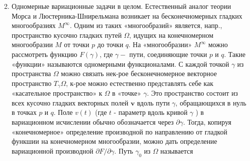 \documentclass[10pt]{article}
\begin{document}
\begin{enumerate}

  \setcounter{enumi}{1}

  \item Одномерные вариационные задачи в целом. Естественный аналог теории Морса и Люстерника-Шнирельмана возникает на бесконечномерных гладких многообразиях $M^{\infty}$. Одним из таких «многообразий» является, напр., пространство кусочно гладких путей $\Omega$, идущих на конечномерном многообразии $M$ от точки $p$ до точки $q$. На «многообразии» $M^{\infty}$ можно рассмотреть функцию $F(\gamma)$, где $\gamma-$ пути, соединяющие точки $p$ и $q$. Такие «функции» называются одномерными функционалами. С каждой точкой $\gamma$ из пространства $\Omega$ можно связать нек-рое бесконечномерное векторное пространство $T_{\gamma} \Omega$, к-рое можно естественно представлять себе как «касательное пространство» к $\Omega$ в «точке» $\gamma$. Это пространство состоит из всех кусочно гладких векторных полей $\boldsymbol{v}$ вдоль пути $\gamma$, обращающихся в нуль в точках $p$ и $q$. Поле $v(t)$ (где $t$ - параметр вдоль кривой $\gamma$ ) в вариационном исчислении обычно обозначается через $\partial \gamma$. Тогда, копируя «конечномерное» определение производной по направлению от гладкой функшии на конечномерном многообразии, можно дать определение вариационной производной $\partial F / \partial \gamma$. Путь $\gamma_{0}$ из $\Omega$ называется

\end{enumerate}
\end{document}
